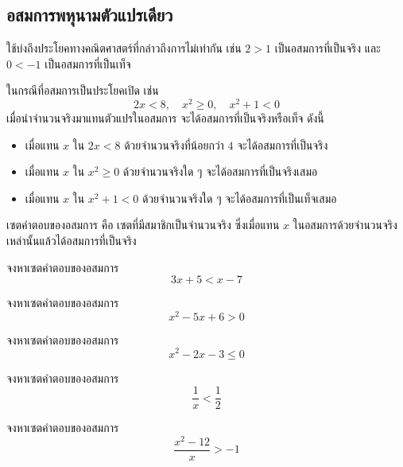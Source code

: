 \newpage
\subsection{อสมการพหุนามตัวแปรเดียว}

 ใช้บ่งถึงประโยคทางคณิตศาสตร์ที่กล่าวถึงการไม่เท่ากัน เช่น $2 > 1$ เป็นอสมการที่เป็นจริง และ $0 < -1$ เป็นอสมการที่เป็นเท็จ 

ในกรณีที่อสมการเป็นประโยคเปิด เช่น 
$$2x < 8, \quad x^2 \geq 0, \quad x^2 + 1 < 0$$
เมื่อนำจำนวนจริงมาแทนตัวแปรในอสมการ จะได้อสมการที่เป็นจริงหรือเท็จ ดังนี้

\vspace{0.5em}
\begin{itemize}[label=\quad, leftmargin=1em, itemsep=0.4em]
	\item เมื่อแทน $x$ ใน $2x < 8$ ด้วยจำนวนจริงที่น้อยกว่า $4$ จะได้อสมการที่เป็นจริง
	\item เมื่อแทน $x$ ใน $x^2 \geq 0$ ด้วยจำนวนจริงใด ๆ จะได้อสมการที่เป็นจริงเสมอ
	\item เมื่อแทน $x$ ใน $x^2 + 1 < 0$ ด้วยจำนวนจริงใด ๆ จะได้อสมการที่เป็นเท็จเสมอ
\end{itemize}

\vspace{0.5em}
เซตคำตอบของอสมการ คือ เซตที่มีสมาชิกเป็นจำนวนจริง ซึ่งเมื่อแทน $x$ ในอสมการด้วยจำนวนจริงเหล่านั้นแล้วได้อสมการที่เป็นจริง

\begin{examplebox}
	จงหาเซตคำตอบของอสมการ 
	$$3x + 5 < x - 7$$
\end{examplebox}
\solution
\newpage

\begin{examplebox}
	จงหาเซตคำตอบของอสมการ 
	$$x^2 - 5x + 6 > 0$$
\end{examplebox}
\solution
\newpage

\begin{examplebox}
	จงหาเซตคำตอบของอสมการ 
	$$x^2 - 2x - 3 \leq 0$$
\end{examplebox}
\solution
\newpage

\begin{examplebox}
	จงหาเซตคำตอบของอสมการ 
	$$\dfrac{1}{x} < \dfrac{1}{2}$$
\end{examplebox}
\solution
\newpage

\begin{examplebox}
	จงหาเซตคำตอบของอสมการ 
	$$\dfrac{x^2 - 12}{x} > -1$$
\end{examplebox}
\solution
\newpage

